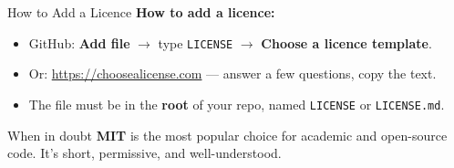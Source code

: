 \documentclass[aspectratio=169, 11pt]{beamer}
\begin{document}
\begin{frame}[fragile]{How to Add a Licence}
  \vspace{0.3em}
  \textbf{How to add a licence:}
  \begin{itemize}
    \item GitHub: \textbf{Add file} $\to$ type \texttt{LICENSE} $\to$ \textbf{Choose a licence template}.
    \item Or: \url{https://choosealicense.com} --- answer a few questions, copy the text.
    \item The file must be in the \textbf{root} of your repo, named \texttt{LICENSE} or \texttt{LICENSE.md}.
  \end{itemize}

  \vspace{0.3em}
  \begin{block}{When in doubt}
    \textbf{MIT} is the most popular choice for academic and open-source code. It's short, permissive, and well-understood.
  \end{block}
\end{frame}
\end{document}
